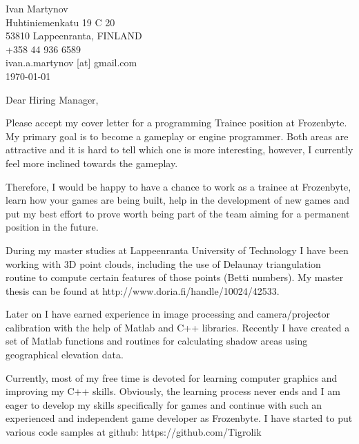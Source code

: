 \documentclass[]{article}
\begin{document}
\begin{flushright}
	Ivan Martynov\\
  Huhtiniemenkatu 19 C 20\\
	53810 Lappeenranta, FINLAND\\
	+358 44 936 6589\\
	ivan.a.martynov [at] gmail.com\\
	\today
\end{flushright}



\noindent
Dear Hiring Manager,
\bigskip

Please accept my cover letter for a programming Trainee position at Frozenbyte.
My primary goal is to become a gameplay or engine programmer. Both areas are
attractive and it is hard to tell which one is more interesting, however, I
currently feel more inclined towards the gameplay.

Therefore, I would be happy to have a chance to work as a trainee at Frozenbyte,
learn how your games are being built, help in the development of new games and
put my best effort to prove worth being part of the team aiming for a
permanent position in the future.

During my master studies at Lappeenranta University of Technology I have been
working with 3D point clouds, including the use of Delaunay triangulation
routine to compute certain features of those points (Betti numbers). My master
thesis can be found at http://www.doria.fi/handle/10024/42533.

Later on I have earned experience in image processing and camera/projector
calibration with the help of Matlab and C++ libraries. Recently I have created
a set of Matlab functions and routines for calculating shadow areas using
geographical elevation data.

Currently, most of my free time is devoted for learning computer graphics and
improving my C++ skills. Obviously, the learning process never ends and I am
eager to develop my skills specifically for games and continue with such an
experienced and independent game developer as Frozenbyte. I have started to put
various code samples at github: https://github.com/Tigrolik
\end{document}
